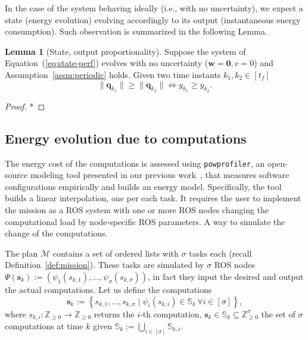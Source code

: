 \documentclass[letterpaper,10pt,conference]{ieeeconf}
\newcommand{\stt}[1]{{\small\tt #1}} %
\newcommand{\powprof}{\stt{powprofiler}}
\theoremstyle{definition}
\newtheorem{lem}[thm]{Lemma}
\begin{document}
In the case of the system behaving ideally (i.e., with no uncertainty), we expect a state (energy evolution) evolving accordingly to its output (instantaneous energy consumption). Such observation is summarized in the following Lemma.

\begin{lem}[State, output proportionality]\label{lem:state-vs-energy}
  Suppose the system of Equation~(\ref{eq:state-perf}) evolves with no uncertainty ($\mathbf{w}=\mathbf{0},v=0$) and Assumption~\ref{assm:periodic} holds. Given two time instants $k_1,k_2\in[t_f]$
  \begin{equation}
    \|\mathbf{q}_{k_1}\|\geq\|\mathbf{q}_{k_2}\|\iff y_{k_1}\geq y_{k_2}.
  \end{equation}
\end{lem}
\begin{proof}
  *
\end{proof}

\subsection{Energy evolution due to computations}
\label{sec:computations-model}

The energy cost of the computations is assessed using \powprof{}, an open-source modeling tool presented in our previous work~\cite{seewald2019coarse}, that measures software configurations empirically and builds an energy model. Specifically, the tool builds a linear interpolation, one per each task. It requires the user to implement the mission as a ROS system with one or more ROS nodes changing the computational load by node-specific ROS parameters. A way to simulate the change of the computations.

The plan $\mathcal{M}$ contains a set of ordered lists with $\sigma$ tasks each (recall Definition~\ref{def:mission}). These tasks are simulated by $\sigma$ ROS nodes $\Psi(\mathbf{s}_k):=\left(\psi_1(s_{k,1}),\dots,\psi_\sigma(s_{k,\sigma})\right)$, in fact they input the desired and output the actual computations. Let us define the computations
\begin{equation}\label{eq:qos-def}
  \mathbf{s}_k:=\left\{s_{k,1},\dots ,s_{k,\sigma}\mid \psi_i(s_{k,i})\in\mathbb{S}_{k}\,\forall i\in[\sigma]\right\},
\end{equation}
where $s_{k,i}:\mathbb{Z}_{\geq 0}\rightarrow\mathbb{Z}_{\geq 0}$ returns the $i$-th computation, $\mathbf{s}_k\in\mathbb{S}_k\subseteq\mathbb{Z}_{\geq 0}^\sigma$ the set of $\sigma$ computations at time $k$ given $\mathbb{S}_k:=\bigcup_{i\in[\sigma]}{\mathbb{S}_{k,i}}$.
\end{document}
